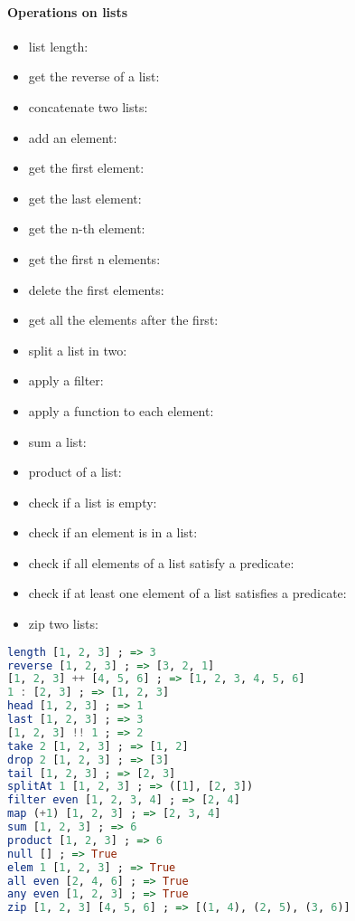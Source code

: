 \documentclass[a4paper,landscape,10pt]{article}
\begin{document}
\begin{multicols*}{2}
  \paragraph{Operations on lists}

  \begin{itemize}

    \item list length: 
    \item get the reverse of a list: 
    \item concatenate two lists: 
    \item add an element: 
    \item get the first element: 
    \item get the last element: 
    \item get the n-th element: 
    \item get the first n elements: 
    \item delete the first  elements: 
    \item get all the elements after the first: 
    \item split a list in two: 
    \item apply a filter: 
    \item apply a function to each element: 
    \item sum a list: 
    \item product of a list: 
    \item check if a list is empty: 
    \item check if an element is in a list: 
    \item check if all elements of a list satisfy a predicate: 
    \item check if at least one element of a list satisfies a predicate: 
    \item zip two lists: 
  \end{itemize}

  \begin{lstlisting}[language=Haskell]
length [1, 2, 3] ; => 3
reverse [1, 2, 3] ; => [3, 2, 1]
[1, 2, 3] ++ [4, 5, 6] ; => [1, 2, 3, 4, 5, 6]
1 : [2, 3] ; => [1, 2, 3]
head [1, 2, 3] ; => 1
last [1, 2, 3] ; => 3
[1, 2, 3] !! 1 ; => 2
take 2 [1, 2, 3] ; => [1, 2]
drop 2 [1, 2, 3] ; => [3]
tail [1, 2, 3] ; => [2, 3]
splitAt 1 [1, 2, 3] ; => ([1], [2, 3])
filter even [1, 2, 3, 4] ; => [2, 4]
map (+1) [1, 2, 3] ; => [2, 3, 4]
sum [1, 2, 3] ; => 6
product [1, 2, 3] ; => 6
null [] ; => True
elem 1 [1, 2, 3] ; => True
all even [2, 4, 6] ; => True
any even [1, 2, 3] ; => True
zip [1, 2, 3] [4, 5, 6] ; => [(1, 4), (2, 5), (3, 6)]
\end{lstlisting}


\end{multicols*}
\end{document}
